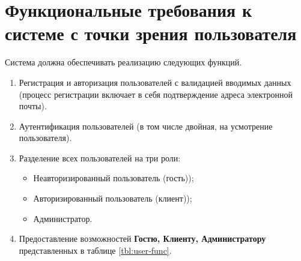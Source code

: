 \section{Функциональные требования к системе с точки зрения пользователя}
Система должна обеспечивать реализацию следующих функций.
\begin{enumerate}
	\item Регистрация и авторизация пользователей с валидацией вводимых данных (процесс регистрации включает в себя подтверждение адреса электронной почты).
	
	\item Аутентификация пользователей (в том числе двойная, на усмотрение пользователя).
	
	\item Разделение всех пользователей на три роли:
	\begin{itemize}
		\item Неавторизированный пользователь (гость));
		
		\item Авторизированный пользователь (клиент));
		
		\item Администратор.
	\end{itemize}
	
	\item Предоставление возможностей \textbf{Гостю, Клиенту, Администратору} представленных в таблице \ref{tbl:user-func}.
\end{enumerate}

